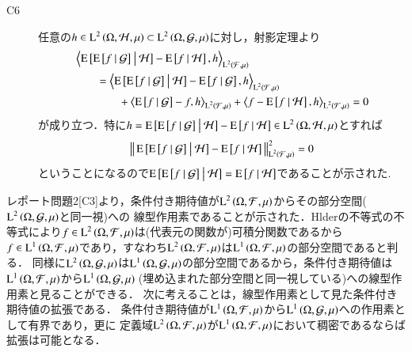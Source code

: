 \begin{prf}
\begin{description}
			\item[C6] 任意の$h \in \operatorname{L}^{2} \left(\Omega, \mathcal{H},\mu\right) \subset \operatorname{L}^{2} \left(\Omega, \mathcal{G},\mu\right)$に対し，射影定理より
				\begin{align}
					&\inprod<\cexp{\cexp{f}{\mathcal{G}}}{\mathcal{H}} - \cexp{f}{\mathcal{H}}, h>_{\Lp{2}{\mathcal{F},\mu}} \\
					&\qquad = \inprod<\cexp{\cexp{f}{\mathcal{G}}}{\mathcal{H}} - \cexp{f}{\mathcal{G}}, h>_{\Lp{2}{\mathcal{F},\mu}} \\
						&\qquad \qquad + \inprod<\cexp{f}{\mathcal{G}} - f, h>_{\Lp{2}{\mathcal{F},\mu}} + \inprod<f - \cexp{f}{\mathcal{H}}, h>_{\Lp{2}{\mathcal{F},\mu}}
					= 0
				\end{align}
				が成り立つ．特に$h = \operatorname{E} \left[ \operatorname{E} \left[ f \ \middle|\ \mathcal{G} \right] \ \middle|\ \mathcal{H} \right] - \operatorname{E} \left[ f \ \middle|\ \mathcal{H} \right] \in \operatorname{L}^{2} \left(\Omega, \mathcal{H},\mu\right)$とすれば
				\begin{align}
					\left\|\, \operatorname{E} \left[ \operatorname{E} \left[ f \ \middle|\ \mathcal{G} \right] \ \middle|\ \mathcal{H} \right] - \operatorname{E} \left[ f \ \middle|\ \mathcal{H} \right]\, \right\|_{\operatorname{L}^{2} \left(\mathcal{F},\mu\right)}^2 = 0
				\end{align}
				ということになるので$\operatorname{E} \left[ \operatorname{E} \left[ f \ \middle|\ \mathcal{G} \right] \ \middle|\ \mathcal{H} \right] = \operatorname{E} \left[ f \ \middle|\ \mathcal{H} \right]$であることが示された.
		\end{description}
		\QED
	\end{prf}
	
	レポート問題2[C3]より，条件付き期待値が$\operatorname{L}^{2} \left(\Omega,\mathcal{F},\mu\right)$からその部分空間($\operatorname{L}^{2} \left(\Omega,\mathcal{G},\mu\right)$と同一視)への
	線型作用素であることが示された．Hlderの不等式の不等式により$f \in \operatorname{L}^{2} \left(\Omega,\mathcal{F},\mu\right)$は(代表元の関数が)可積分関数であるから
	$f \in \operatorname{L}^{1} \left(\Omega,\mathcal{F},\mu\right)$であり，すなわち$\operatorname{L}^{2} \left(\Omega,\mathcal{F},\mu\right)$は$\operatorname{L}^{1} \left(\Omega,\mathcal{F},\mu\right)$の部分空間であると判る．
	同様に$\operatorname{L}^{2} \left(\Omega,\mathcal{G},\mu\right)$は$\operatorname{L}^{1} \left(\Omega,\mathcal{G},\mu\right)$の部分空間であるから，条件付き期待値は
	$\operatorname{L}^{1} \left(\Omega,\mathcal{F},\mu\right)$から$\Lp{1}{\Omega,\mathcal{G},\mu}\ $(埋め込まれた部分空間と同一視している)への線型作用素と見ることができる．
	次に考えることは，線型作用素として見た条件付き期待値の拡張である．
	条件付き期待値が$\operatorname{L}^{1} \left(\Omega,\mathcal{F},\mu\right)$から$\operatorname{L}^{1} \left(\Omega,\mathcal{G},\mu\right)$への作用素として有界であり，更に
	定義域$\operatorname{L}^{2} \left(\Omega,\mathcal{F},\mu\right)$が$\operatorname{L}^{1} \left(\Omega,\mathcal{F},\mu\right)$において稠密であるならば拡張は可能となる．
	

